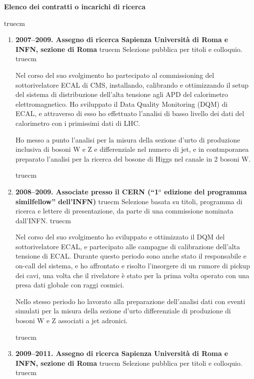 \documentclass[11pt,twoside,a4paper]{article}
\begin{document}
\begin{center}
\textbf{Elenco dei contratti o incarichi di ricerca}
\end{center}
 truecm

\begin{enumerate}  
\item \textbf{2007--2009. Assegno di ricerca Sapienza Universit\`a di
  Roma e INFN, sezione di Roma}
 truecm
Selezione pubblica per titoli e colloquio.
 truecm

Nel corso del suo svolgimento ho partecipato al commissioning del
sottorivelatore ECAL di CMS, installando, calibrando e ottimizzando il
setup del sistema di distribuzione dell'alta tensione agli APD del
calorimetro elettromagnetico. Ho sviluppato il Data Quality Monitoring
(DQM) di ECAL, e attraverso di esso ho effettuato l'analisi di basso
livello dei dati del calorimetro con i primissimi dati di LHC.

Ho messo a punto l'analisi per la misura della sezione d'urto di
produzione inclusiva di bosoni W e Z e differenziale nel numero di
jet, e in contmporanea preparato l'analisi per la ricerca del bosone
di Higgs nel canale in 2 bosoni W.

 truecm
\item \textbf{2008--2009. Associate presso il CERN (``1$^a$ edizione del
  programma similfellow'' dell'INFN)}
 truecm
Selezione basata su titoli, programma di ricerca e
lettere di presentazione, da parte di una commissione nominata dall'INFN.
 truecm

Nel corso del suo svolgimento ho sviluppato e ottimizzato il DQM del
sottorivelatore ECAL, e partecipato alle campagne di calibrazione
dell'alta tensione di ECAL. Durante questo periodo sono anche stato il
responsabile e on-call del sistema, e ho affrontato e risolto
l'insorgere di un rumore di pickup dei cavi, una volta che il
rivelatore \`e stato per la prima volta operato con una presa dati
globale con raggi cosmici.

Nello stesso periodo ho lavorato alla preparazione dell'analisi dati
con eventi simulati per la misura della sezione d'urto differenziale
di produzione di bosoni W e Z associati a jet adronici.


 truecm
\item \textbf{2009--2011. Assegno di ricerca Sapienza Universit\`a di
  Roma e INFN, sezione di Roma}
 truecm
Selezione pubblica per titoli e colloquio.
 truecm


\end{enumerate}
\end{document}
